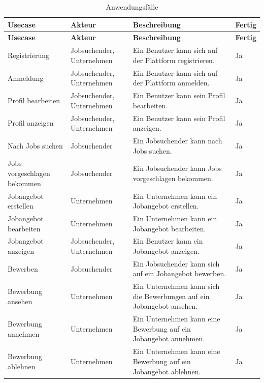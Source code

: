 \documentclass[12pt, letterpaper]{article}
\begin{document}
    \begin{longtable}[htbp]{|p{}|p{}|p{}|p{}|}
       
        \hline
        \textbf{Usecase}&\textbf{Akteur}&\textbf{Beschreibung}&\textbf{Fertig}\\
        \hline
        \hline
        \endfirsthead

        \hline
        \textbf{Usecase}&\textbf{Akteur}&\textbf{Beschreibung}&\textbf{Fertig}\\
        \hline
        \hline
        \endhead

        \hline
        \endfoot

        \hline
        \caption{Anwendungsfälle}  \label{tab:Anwendungsfaelle} 
        \endlastfoot
        Registrierung& Jobsuchender, Unternehmen & Ein Benutzer kann sich auf der Plattform registrieren. & Ja \\
        \hline
        Anmeldung& Jobsuchender, Unternehmen & Ein Benutzer kann sich auf der Plattform anmelden. & Ja \\
        \hline
        Profil bearbeiten& Jobsuchender, Unternehmen & Ein Benutzer kann sein Profil bearbeiten. & Ja \\
        \hline
        Profil anzeigen& Jobsuchender, Unternehmen & Ein Benutzer kann sein Profil anzeigen. & Ja \\
        \hline
        Nach Jobs suchen& Jobsuchender & Ein Jobsuchender kann nach Jobs suchen. & Ja \\
        \hline
        Jobs vorgeschlagen bekommen& Jobsuchender & Ein Jobsuchender kann Jobs vorgeschlagen bekommen. & Ja \\
        \hline
        Jobangebot erstellen& Unternehmen & Ein Unternehmen kann ein Jobangebot erstellen. & Ja \\
        \hline
        Jobangebot bearbeiten& Unternehmen & Ein Unternehmen kann ein Jobangebot bearbeiten. & Ja \\
        \hline
        Jobangebot anzeigen& Jobsuchender, Unternehmen & Ein Benutzer kann ein Jobangebot anzeigen. & Ja \\
        \hline
        Bewerben& Jobsuchender & Ein Jobsuchender kann sich auf ein Jobangebot bewerben. & Ja \\
        \hline
        Bewerbung ansehen& Unternehmen & Ein Unternehmen kann sich die Bewerbungen auf ein Jobangebot ansehen. & Ja \\
        \hline
        Bewerbung annehmen& Unternehmen & Ein Unternehmen kann eine Bewerbung auf ein Jobangebot annehmen. & Ja \\
        \hline
        Bewerbung ablehnen& Unternehmen & Ein Unternehmen kann eine Bewerbung auf ein Jobangebot ablehnen. & Ja \\
    \end{longtable}
\end{document}
